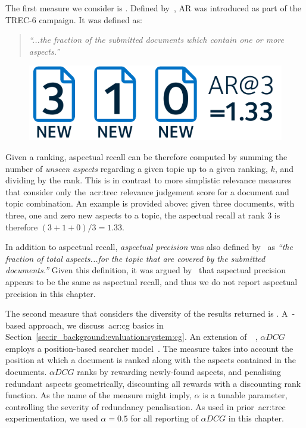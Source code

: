 The first measure we consider is . Defined by~\cite{over1998trec}, AR was introduced as part of the TREC-6 campaign. It was defined as:

\begin{quote}
    \emph{``...the fraction of the submitted documents which contain one or more aspects.''}
\end{quote}

\begin{figure}
    \begin{center}
    \vspace*{-10mm}
    \includegraphics[width=1\textwidth]{figures/ch8-aspectual_recall.pdf}
    \end{center}
    \label{fig:aspectual_recall}
\end{figure}

Given a ranking, aspectual recall can be therefore computed by summing the number of \emph{unseen aspects} regarding a given topic up to a given ranking, $k$, and dividing by the rank. This is in contrast to more simplistic relevance measures that consider only the~\gls{acr:trec} relevance judgement score for a document and topic combination. An example is provided above: given three documents, with three, one and zero new aspects to a topic, the aspectual recall at rank 3 is therefore $(3+1+0)/3 = 1.33$.

In addition to aspectual recall, \emph{aspectual precision} was also defined by~\cite{over2001trec} as \emph{``the fraction of total aspects...for the topic that are covered by the submitted documents.''} Given this definition, it was argued by~\cite{sanderson2010test} that aspectual precision appears to be the same as aspectual recall, and thus we do not report aspectual precision in this chapter.

The second measure that considers the diversity of the results returned is . A~-based approach, we discuss~\gls{acr:cg} basics in Section~\ref{sec:ir_background:evaluation:system:cg}. An extension of~~\citep{jarvelin2002cg}, $\alpha DCG$ employs a position-based searcher model~\citep{clarke2008adcg}. The measure takes into account the position at which a document is ranked along with the aspects contained in the documents. $\alpha DCG$ ranks by rewarding newly-found aspects, and penalising redundant aspects geometrically, discounting all rewards with a discounting rank function. As the name of the measure might imply, $\alpha$ is a tunable parameter, controlling the severity of redundancy penalisation. As used in prior~\gls{acr:trec} experimentation, we used $\alpha=0.5$ for all reporting of $\alpha DCG$ in this chapter.

